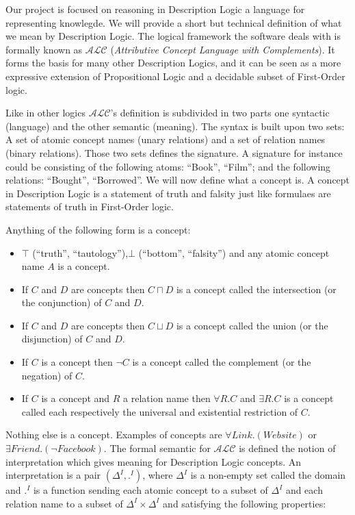 Our project is focused on reasoning in Description Logic a language
for representing knowlegde.  We will provide a short but technical
definition of what we mean by Description Logic. The logical framework
the software deals with is formally known as $\mathcal{ALC}$
(\textit{Attributive Concept Language with Complements}). It forms the
basis for many other Description Logics, and it can be seen as a more
expressive extension of Propositional Logic and a decidable subset of
First-Order logic.

Like in other logics $\mathcal{ALC}$'s definition is subdivided in two
parts one syntactic (language) and the other semantic (meaning). The
syntax is built upon two sets: A set of atomic concept names (unary
relations) and a set of relation names (binary relations). Those two
sets defines the signature. A signature for instance could be
consisting of the following atoms: ``Book'', ``Film''; and the
following relations: ``Bought'', ``Borrowed''. We will now define what
a concept is. A concept in Description Logic is a statement of truth
and falsity just like formulaes are statements of truth in First-Order
logic.

Anything of the following form is a concept:
\begin{itemize}
\item $\top$ (``truth'', ``tautology''),$\bot$ (``bottom'', ``falsity'') and any atomic concept name $A$ is a concept.
\item If $C$ and $D$ are concepts then $C \sqcap D$ is a concept
  called the intersection (or the conjunction) of $C$ and $D$.
\item If $C$ and $D$ are concepts then $C \sqcup D$ is a concept
  called the union (or the disjunction) of $C$ and $D$.
\item If $C$ is a concept then $\neg C$ is a concept called the complement (or the
  negation) of $C$.
\item If $C$ is a concept and $R$ a relation name then $\forall R . C$
  and $\exists R . C$ is a concept called each respectively the
  universal and existential restriction of $C$.
\end{itemize}

Nothing else is a concept. Examples of concepts are $\forall Link
. (Website)$ or $\exists Friend . (\neg Facebook)$. The 
formal semantic for $\mathcal{ALC}$ is defined the notion of
interpretation which gives meaning for Description Logic concepts. An
interpretation is a pair $(\Delta^{I},.^{I})$, where $\Delta^{I}$ is a
non-empty set called the domain and $.^{I}$ is a function sending each
atomic concept to a subset of $\Delta^{I}$ and each relation name to a
subset of $\Delta^{I} \times \Delta^{I}$ and satisfying the following 
properties:


